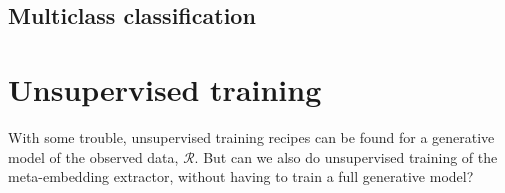 \documentclass[a4paper,oneside,12pt,english]{report}
\def\Lset{\mathcal{L}}
\def\Rset{\mathcal{R}}
\begin{document}
 

\section{Multiclass classification}
\cite{DSIS17,LIMSI_Language_embedding}







\chapter{Unsupervised training}
With some trouble, unsupervised training recipes can be found for a generative model of the observed data, $\Rset$. But can we also do unsupervised training of the meta-embedding extractor, without having to train a full generative model?


%

\appendix

\end{document}
